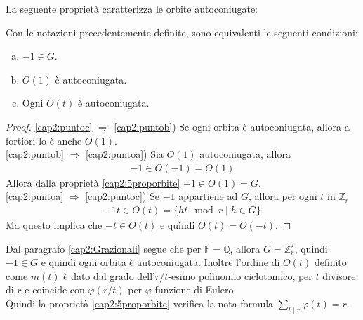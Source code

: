 La seguente proprietà caratterizza le orbite autoconiugate:
\begin{prop}
Con le notazioni precedentemente definite, sono equivalenti le seguenti condizioni:
\begin{enumerate}[(a)]
   \item \label{cap2:puntoa} $-1 \in G$.
   \item \label{cap2:puntob} $ O(1)$ è autoconiugata.
   \item \label{cap2:puntoc} Ogni $O(t)$ è autoconiugata.
\end{enumerate}
\end{prop}
\begin{proof}
\ref{cap2:puntoc} $\Rightarrow$ \ref{cap2:puntob}) Se ogni orbita è autoconiugata, allora a fortiori lo è anche $O(1)$. \\
\ref{cap2:puntob} $\Rightarrow$ \ref{cap2:puntoa}) Sia $O(1)$ autoconiugata, allora 
          \begin{align*}
            -1 \in O(-1) = O(1)
          \end{align*}
          Allora dalla proprietà \ref{cap2:5proporbite} $-1 \in O(1) = G$.\\
\ref{cap2:puntoa} $\Rightarrow$ \ref{cap2:puntoc}) Se $-1$ appartiene ad $G$, allora per ogni $t$ in $\mathbb{Z}_{r}$ 
          \begin{align*}
            -1t \in O(t) = \lbrace ht \mod{r} \mid h \in G \rbrace
          \end{align*}
          Ma questo implica che $-t \in O(t)$ e quindi $O(t) = O(-t)$. 
\end{proof}
\begin{osservazione}
   Dal paragrafo \ref{cap2:Grazionali} segue che per $\mathbb{F}=\mathbb{Q}$, allora $G=\mathbb{Z}_{r}^{\star}$, quindi $-1 \in G$ e quindi ogni orbita è autoconiugata. Inoltre l'ordine di $O(t)$ definito come $m(t)$ è dato dal grado dell'$r/t$-esimo polinomio ciclotomico, per $t$ divisore di $r$ e coincide con $\varphi(r/t)$ per $\varphi$ funzione di Eulero. \\
   Quindi la proprietà \ref{cap2:5proporbite} verifica la nota formula $\sum_{t \mid r} \varphi(t) = r$.
\end{osservazione}

